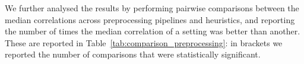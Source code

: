 




We further analysed the results by performing pairwise comparisons between the median correlations across preprocessing pipelines and heuristics, and reporting the number of times the median correlation of a setting was better than another. These are reported in Table~\ref{tab:comparison_preprocessing}: in brackets we reported the number of comparisons that were statistically significant. 


